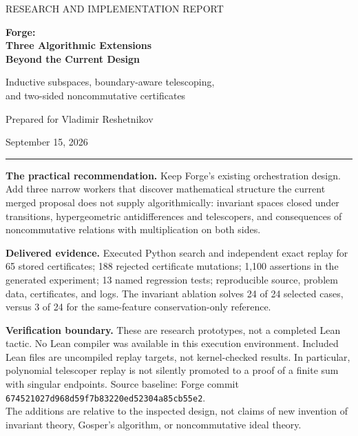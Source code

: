 \documentclass[11pt,letterpaper]{article}
\theoremstyle{definition}\newtheorem{definition}[theorem]{Definition}
\theoremstyle{remark}\newtheorem{remark}[theorem]{Remark}
\begin{document}
\begin{titlepage}
\vspace*{0.6in}
{\Large\sffamily RESEARCH AND IMPLEMENTATION REPORT\par}
\vspace{0.35in}
{\Huge\bfseries Forge:\\[6pt] Three Algorithmic Extensions\\[6pt] Beyond the Current Design\par}
\vspace{0.3in}
{\Large Inductive subspaces, boundary-aware telescoping,\\and two-sided noncommutative certificates\par}
\vspace{0.45in}
{\large Prepared for Vladimir Reshetnikov\par}
{\large September 15, 2026\par}
\vspace{0.35in}
\rule{\textwidth}{0.5pt}
\vspace{0.1in}
\textbf{The practical recommendation.} Keep Forge's existing orchestration design.
Add three narrow workers that discover mathematical structure the current
merged proposal does not supply algorithmically: invariant spaces closed under
transitions, hypergeometric antidifferences and telescopers, and consequences of
noncommutative relations with multiplication on both sides.

\textbf{Delivered evidence.} Executed Python search and independent exact replay
for 65 stored certificates; 188 rejected certificate mutations; 1,100 assertions
in the generated experiment; 13 named regression tests; reproducible source,
problem data, certificates, and logs. The invariant ablation solves 24 of 24
selected cases, versus 3 of 24 for the same-feature conservation-only reference.

\textbf{Verification boundary.} These are research prototypes, not a completed
Lean tactic. No Lean compiler was available in this execution environment.
Included Lean files are uncompiled replay targets, not kernel-checked results.
In particular, polynomial telescoper replay is not silently promoted to a proof
of a finite sum with singular endpoints.
\vfill
{\small Source baseline: Forge commit
\nolinkurl{674521027d968d59f7b83220ed52304a85cb55e2}.\\
The additions are relative to the inspected design, not claims of new invention
of invariant theory, Gosper's algorithm, or noncommutative ideal theory.}
\end{titlepage}
\end{document}
